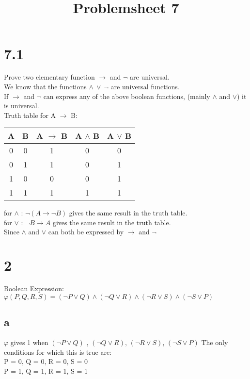 \documentclass{article}
\begin{document}
    \title{Problemsheet 7}
    \maketitle

    \section{\textbf{7.1}}
    Prove two elementary function $\rightarrow$ and $\neg$ are universal.\\
    We know that the functions $\land \  \lor \  \neg$ are universal functions.\\
    If $\rightarrow$ and $\neg$ can express any of the above boolean functions, (mainly $\land$ and $\lor$) it is universal.\\
    Truth table for A $\rightarrow$ B:\\
    \begin{center}
        \begin{tabular}{|c|c|c|c|c|}
            \hline
            A & B & A $\rightarrow$ B & A $\land$ B & A $\lor$ B\\
            \hline
            0 & 0 & 1 & 0 & 0 \\
            \hline
            0 & 1 & 1 & 0 & 1 \\
            \hline
            1 & 0 & 0 & 0 & 1\\
            \hline
            1 & 1 & 1 & 1 & 1\\
            \hline
        \end{tabular}
    \end{center}
    for $\land$ :
    $\neg(A \rightarrow \neg B)$ gives the same result in the truth table.\\
    for $\lor$ :
    $\neg B \rightarrow A$ gives the same result in the truth table.\\
    Since $\land$ and $\lor$ can both be expressed by $\rightarrow$ and $\neg$

    \section{\textbf{2}}

    Boolean Expression:\\
    $\varphi(P, Q, R, S) = (\neg P \lor Q) \land (\neg Q \lor R) \land (\neg R \lor S) \land (\neg S \lor P)$
    \subsection{\textbf{a}}
    $\varphi$ gives 1 when $(\neg P \lor Q)$ , $(\neg Q \lor R)$, $(\neg R \lor S)$, $(\neg S \lor P)$
    The only conditions for which this is true are:\\
    P = 0, Q = 0, R = 0, S = 0\\
    P = 1, Q = 1, R = 1, S = 1\\
\end{document}
